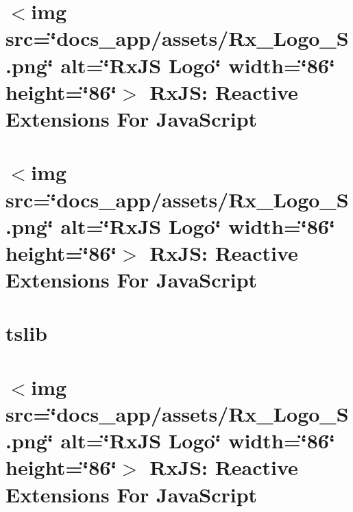 \documentclass[twoside]{book}
\newcommand{\+}{\discretionary{\mbox{\scriptsize$\hookleftarrow$}}{}{}}
\begin{document}
\chapter{\texorpdfstring{$<$}{<}img src=\char`\"{}docs\+\_\+app/assets/\+Rx\+\_\+\+Logo\+\_\+\+S.\+png\char`\"{} alt=\char`\"{}\+Rx\+JS Logo\char`\"{} width=\char`\"{}86\char`\"{} height=\char`\"{}86\char`\"{}\texorpdfstring{$>$}{>} Rx\+JS\+: Reactive Extensions For Java\+Script}
\label{md__c___users_vaishnavi_jadhav__desktop__developer_code_mean_stack_example_client_node_modules__42c72acdb137a50cf91b53170e3d8a45}

\chapter{\texorpdfstring{$<$}{<}img src=\char`\"{}docs\+\_\+app/assets/\+Rx\+\_\+\+Logo\+\_\+\+S.\+png\char`\"{} alt=\char`\"{}\+Rx\+JS Logo\char`\"{} width=\char`\"{}86\char`\"{} height=\char`\"{}86\char`\"{}\texorpdfstring{$>$}{>} Rx\+JS\+: Reactive Extensions For Java\+Script}
\label{md__c___users_vaishnavi_jadhav__desktop__developer_code_mean_stack_example_client_node_modules__96a6084a8efd9f8430ef66db95769d57}

\chapter{tslib}
\label{md__c___users_vaishnavi_jadhav__desktop__developer_code_mean_stack_example_client_node_modules__f7ec6a411f38e8eca8a91ed8ddce2d61}

\chapter{\texorpdfstring{$<$}{<}img src=\char`\"{}docs\+\_\+app/assets/\+Rx\+\_\+\+Logo\+\_\+\+S.\+png\char`\"{} alt=\char`\"{}\+Rx\+JS Logo\char`\"{} width=\char`\"{}86\char`\"{} height=\char`\"{}86\char`\"{}\texorpdfstring{$>$}{>} Rx\+JS\+: Reactive Extensions For Java\+Script}
\label{md__c___users_vaishnavi_jadhav__desktop__developer_code_mean_stack_example_client_node_modules__3a86af05a1736f88ab79d3ef2b71a816}

\end{document}
